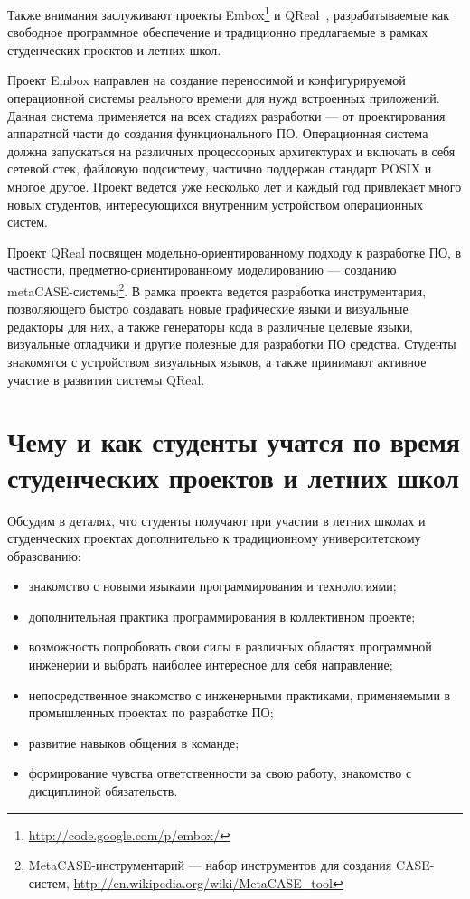 \documentclass[a4paper]{article}
\begin{document}
Также внимания заслуживают проекты Embox\footnote{\url{ http://code.google.com/p/embox/}} и QReal~\cite{qreal2, qreal3, qreal}, разрабатываемые как свободное программное обеспечение и традиционно предлагаемые в рамках студенческих проектов и летних школ. 

Проект Embox направлен на создание переносимой  и конфигурируемой операционной системы реального времени для нужд встроенных приложений. Данная система применяется на всех стадиях разработки --- от проектирования аппаратной части до создания функционального ПО. Операционная система  должна запускаться на различных процессорных архитектурах и включать в себя сетевой стек, файловую подсистему, частично поддержан стандарт POSIX и многое другое. Проект ведется уже несколько лет и каждый год привлекает много новых студентов, интересующихся внутренним устройством операционных систем.  

Проект QReal посвящен модельно-ориентированному подходу к разработке ПО, в частности, предметно-ориентированному моделированию --- созданию metaCASE-системы\footnote{MetaCASE-инструментарий --- набор инструментов для создания CASE-систем, \url{http://en.wikipedia.org/wiki/MetaCASE_tool}}. В рамка проекта ведется разработка инструментария, позволяющего быстро создавать новые графические языки и визуальные редакторы для них, а также генераторы кода в различные целевые языки, визуальные отладчики и другие полезные для разработки ПО средства. Студенты знакомятся с устройством визуальных языков, а также принимают активное участие в развитии системы QReal.

\section{Чему и как студенты учатся по время студенческих проектов и летних школ}

Обсудим в деталях, что студенты получают при участии в летних школах и студенческих проектах дополнительно к традиционному университетскому образованию:

\begin{itemize}
 \item знакомство с новыми языками программирования и технологиями;
 \item дополнительная практика программирования в коллективном проекте;
 \item возможность попробовать свои силы в различных областях программной инженерии и выбрать наиболее интересное для себя направление;
 \item непосредственное знакомство с инженерными практиками, применяемыми в промышленных проектах по разработке ПО;
 \item развитие навыков общения в команде;
 \item формирование чувства ответственности за свою работу, знакомство с дисциплиной обязательств.
\end{itemize}
\end{document}
